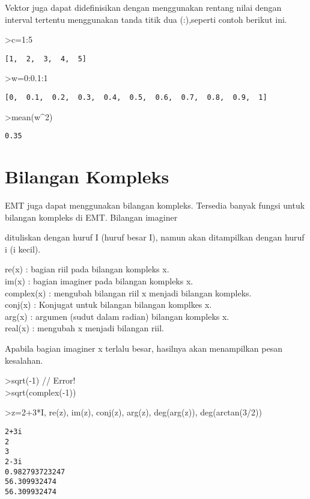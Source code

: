 \documentclass[
]{book}
\begin{document}
Vektor juga dapat didefinisikan dengan menggunakan rentang nilai dengan interval tertentu menggunakan tanda titik dua (:),seperti contoh berikut ini.

\textgreater c=1:5

\begin{verbatim}
[1,  2,  3,  4,  5]
\end{verbatim}

\textgreater w=0:0.1:1

\begin{verbatim}
[0,  0.1,  0.2,  0.3,  0.4,  0.5,  0.6,  0.7,  0.8,  0.9,  1]
\end{verbatim}

\textgreater mean(w\^{}2)

\begin{verbatim}
0.35
\end{verbatim}

\chapter{Bilangan Kompleks}\label{bilangan-kompleks}

EMT juga dapat menggunakan bilangan kompleks. Tersedia banyak fungsi untuk bilangan kompleks di EMT. Bilangan imaginer

dituliskan dengan huruf I (huruf besar I), namun akan ditampilkan dengan huruf i (i kecil).

re(x) : bagian riil pada bilangan kompleks x.\\
im(x) : bagian imaginer pada bilangan kompleks x.\\
complex(x) : mengubah bilangan riil x menjadi bilangan kompleks.\\
conj(x) : Konjugat untuk bilangan bilangan komplkes x.\\
arg(x) : argumen (sudut dalam radian) bilangan kompleks x.\\
real(x) : mengubah x menjadi bilangan riil.

Apabila bagian imaginer x terlalu besar, hasilnya akan menampilkan pesan kesalahan.

\textgreater sqrt(-1) // Error!\\
\textgreater sqrt(complex(-1))

\textgreater z=2+3*I, re(z), im(z), conj(z), arg(z), deg(arg(z)), deg(arctan(3/2))

\begin{verbatim}
2+3i
2
3
2-3i
0.982793723247
56.309932474
56.309932474
\end{verbatim}
\end{document}
